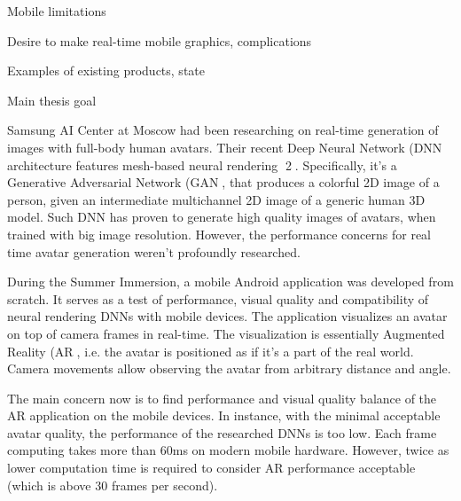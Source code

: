  
 Mobile limitations
 
 Desire to make real-time mobile graphics, complications
 
 Examples of existing products, state
 
 Main thesis goal
 
 Samsung AI Center at Moscow had been researching on real-time generation of images
 with full-body human avatars. Their recent Deep Neural Network (DNN architecture
 features mesh-based neural rendering 2. Specifically, it's a Generative Adversarial
 Network (GAN, that produces a colorful 2D image of a person, given an intermediate
 multichannel 2D image of a generic human 3D model. Such DNN has proven to generate
 high quality images of avatars, when trained with big image resolution. However, the
 performance concerns for real time avatar generation weren't profoundly researched.
 
 During the Summer Immersion, a mobile Android application was developed from
 scratch. It serves as a test of performance, visual quality and compatibility of neural
 rendering DNNs with mobile devices. The application visualizes an avatar on top of
 camera frames in real-time. The visualization is essentially Augmented Reality (AR, i.e.
 the avatar is positioned as if it's a part of the real world. Camera movements allow
 observing the avatar from arbitrary distance and angle.
 
 The main concern now is to find performance and visual quality balance of the AR
 application on the mobile devices. In instance, with the minimal acceptable avatar
 quality, the performance of the researched DNNs is too low. Each frame computing
 takes more than 60ms on modern mobile hardware. However, twice as lower
 computation time is required to consider AR performance acceptable (which is above 30
 frames per second).

